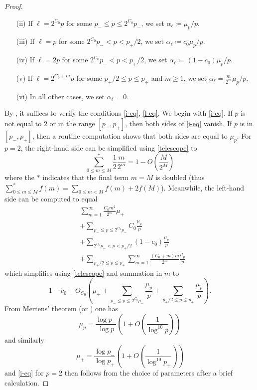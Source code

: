 \documentclass[12pt,a4paper,reqno]{amsart}
\numberwithin{equation}{section}
\theoremstyle{plain}
\theoremstyle{definition}
\begin{document}
\begin{proof}
\begin{itemize}
\item[(ii)] If $\ell = 2^{C_0} p$ for some $p_- \leq p \leq 2^{C_0} p_-$, we set $\alpha_\ell \coloneqq \mu_p/p$.
\item[(iii)] If $\ell = p$ for some $2^{C_0} p_- < p < p_+/2$, we set $\alpha_\ell \coloneqq c_0 \mu_p/p$.
\item[(iv)] If $\ell = 2p$ for some $2^{C_0} p_- < p < p_+/2$, we set $\alpha_\ell \coloneqq (1-c_0) \mu_p/p$.
\item[(v)] If $\ell = 2^{C_0+m} p$ for some $p_+/2 \leq p \leq p_+$ and $m \geq 1$, we set $\alpha_\ell = \frac{m}{2^m} \mu_p/p$.
\item[(vi)] In all other cases, we set $\alpha_\ell = 0$.
\end{itemize}

By , it suffices to verify the conditions \eqref{i-eq}, \eqref{l-eq}.  We begin with \eqref{i-eq}.  If $p$ is not equal to $2$ or in the range $[p_-,p_+]$, then both sides of \eqref{i-eq} vanish.  If $p$ is in $[p_-,p_+]$, then a routine computation shows that both sides are equal to $\mu_p$.  For $p=2$, the right-hand side can be simplified using \eqref{telescope} to
$$ \sum_{0 \leq m \leq M}^* \frac{1}{2} \frac{m}{2^m} = 1 - O\left( \frac{M}{2^M} \right)$$
where the $*$ indicates that the final term $m=M$ is doubled (thus $\sum_{0 \leq m \leq M}^* f(m) = \sum_{0 \leq m<M} f(m) + 2 f(M)$).  Meanwhile, the left-hand side can be computed to equal
\begin{align*}
  &\sum_{m=1}^\infty \frac{C_0 m^2}{2^m} \mu_+ \\
  & + \sum_{p_- \leq p \leq 2^{C_0} p_-} C_0 \frac{\mu_p}{p} \\
  & + \sum_{2^{C_0} p_- < p < p_+/2} (1-c_0) \frac{\mu_p}{p} \\
  & + \sum_{p_+/2 \leq p \leq p_+} \sum_{m=1}^\infty \frac{(C_0+m) m}{2^m} \frac{\mu_p}{p}
\end{align*}
which simplifies using \eqref{telescope} and summation in $m$ to
$$ 1 - c_0 + O_{C_0}\left( \mu_+ + \sum_{p_- \leq p \leq 2^{C_0} p_-} \frac{\mu_p}{p} + \sum_{p_+/2 \leq p \leq p_+} \frac{\mu_p}{p}\right).$$
From Mertens' theorem (or ) one has
\begin{equation}\label{mertens}
  \mu_p = \frac{\log p_-}{\log p} \left( 1 + O\left( \frac{1}{\log^{10} p} \right) \right)
\end{equation}
and similarly
\begin{equation}\label{mertens-2}
  \mu_+ = \frac{\log p_-}{\log p_+} \left( 1 + O\left( \frac{1}{\log^{10} p_+} \right) \right)
\end{equation}
and \eqref{i-eq} for $p=2$ then follows from the choice of parameters after a brief calculation.


\end{proof}
\end{document}
